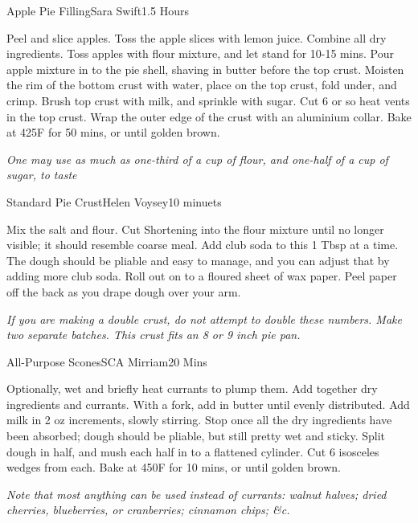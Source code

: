 \documentclass{book}
\begin{document}
\begin{recipe}{Apple Pie Filling}{Sara Swift}{1.5 Hours}
  
  Peel and slice apples. Toss the apple slices with lemon
  juice. Combine all dry ingredients. Toss apples with flour mixture,
  and let stand for 10-15 mins. Pour apple mixture in to the pie
  shell, shaving in butter before the top crust. Moisten the rim of
  the bottom crust with water, place on the top crust, fold under, and
  crimp. Brush top crust with milk, and sprinkle with sugar. Cut 6 or
  so heat vents in the top crust. Wrap the outer edge of the crust
  with an aluminium collar. Bake at 425\0F for 50 mins, or until
  golden brown.
\end{recipe}
\textit{One may use as much as one-third of a cup of flour, and
  one-half of a cup of sugar, to taste}

\begin{recipe}{Standard Pie Crust}{Helen Voysey}{10 minuets}

  Mix the salt and flour. Cut Shortening into the flour mixture until no
  longer visible; it should resemble coarse meal. Add club soda to this
  1 Tbsp at a time. The dough should be pliable and easy to manage,
  and you can adjust that by adding more club soda. Roll out on to a
  floured sheet of wax paper. Peel paper off the back as you drape
  dough over your arm.
\end{recipe}
\textit{If you are making a double crust, do not attempt to double
  these numbers. Make two separate batches. This crust fits an 8 or 9
  inch pie pan.}

\begin{recipe}{All-Purpose Scones}{SCA Mirriam}{20 Mins}

  Optionally, wet and briefly heat currants to plump them. Add
  together dry ingredients and currants. With a fork, add in butter
  until evenly distributed. Add milk in 2 oz increments, slowly
  stirring. Stop once all the dry ingredients have been absorbed;
  dough should be pliable, but still pretty wet and sticky. Split
  dough in half, and mush each half in to a flattened cylinder. Cut 6
  isosceles wedges from each. Bake at 450\0F for 10 mins, or until
  golden brown.
\end{recipe}
\textit{Note that most anything can be used instead of currants:
  walnut halves; dried cherries, blueberries, or cranberries; cinnamon
  chips; \&c.}
\end{document}
